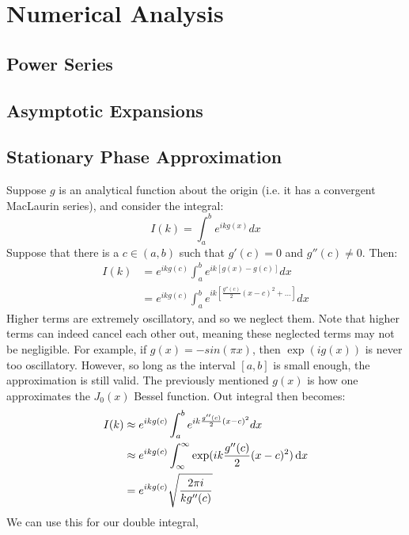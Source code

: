 \section{Numerical Analysis}
    \subsection{Power Series}
    \subsection{Asymptotic Expansions}
    \subsection{Stationary Phase Approximation}
        Suppose $g$ is an analytical function about
        the origin (i.e. it has a convergent MacLaurin series),
        and consider the integral:
        \begin{equation}
            I(k) = \int_{a}^{b}e^{ikg(x)}dx
        \end{equation}
        Suppose that there is a $c\in(a,b)$ such
        that $g'(c)=0$ and $g''(c)\ne 0$. Then:
        \begin{align}
            \nonumber I(k)&=e^{ikg(c)}\int_{a}^{b}e^{ik[g(x)-g(c)]}dx\\
            &=e^{ikg(c)}\int_{a}^{b}e^{ik[\frac{g''(c)}{2}(x-c)^{2}+\hdots]}dx
        \end{align}
        Higher terms are extremely oscillatory, and so we neglect them.
        Note that higher terms can indeed cancel each
        other out, meaning these neglected terms may
        not be negligible. For example, if
        $g(x)=-sin(\pi x)$, then $\exp(ig(x))$ is never
        too oscillatory. However, so long as the interval
        $[a,b]$ is small enough, the approximation is still
        valid. The previously mentioned $g(x)$ is how
        one approximates the $J_{0}(x)$ Bessel function.
        Out integral then becomes:
        \begin{align}
            I(k)&\approx e^{ikg(c)}
                    \int_{a}^{b}e^{ik\frac{g''(c)}{2}(x-c)^{2}}dx\\
                &\approx e^{ikg(c)}
                    \int_{\infty}^{\infty}
                    \exp(ik\frac{g''(c)}{2}(x-c)^{2})\mathop{}\!\mathrm{d}{x}\\
                &=e^{ikg(c)}\sqrt{\frac{2\pi i}{kg''(c)}}
        \end{align}
        We can use this for our double integral,
